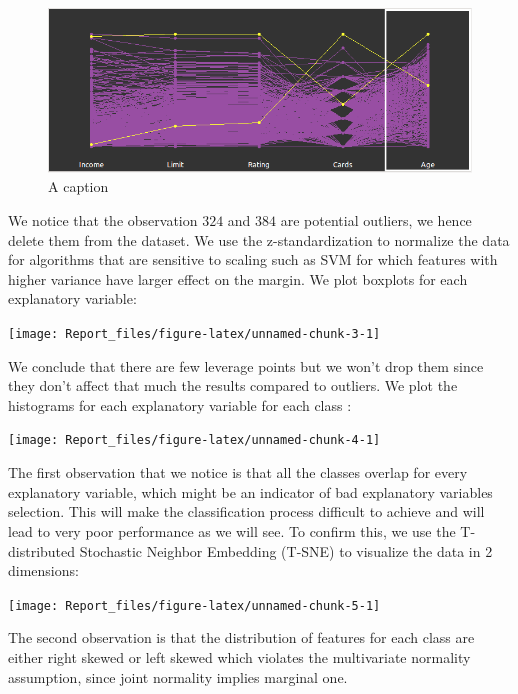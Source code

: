 \documentclass[]{article}
\begin{document}
\begin{figure}
\includegraphics[width=1\linewidth]{plots/potential outliers 384 & 324} \caption{A caption}\label{fig:pressure}
\end{figure}

We notice that the observation \(324\) and \(384\) are potential
outliers, we hence delete them from the dataset. We use the
z-standardization to normalize the data for algorithms that are
sensitive to scaling such as SVM for which features with higher variance
have larger effect on the margin. We plot boxplots for each explanatory
variable:

\begin{center}\texttt{[image: Report\_files/figure-latex/unnamed-chunk-3-1]} \end{center}

We conclude that there are few leverage points but we won't drop them
since they don't affect that much the results compared to outliers. We
plot the histograms for each explanatory variable for each class :

\begin{center}\texttt{[image: Report\_files/figure-latex/unnamed-chunk-4-1]} \end{center}

The first observation that we notice is that all the classes overlap for
every explanatory variable, which might be an indicator of bad
explanatory variables selection. This will make the classification
process difficult to achieve and will lead to very poor performance as
we will see. To confirm this, we use the T-distributed Stochastic
Neighbor Embedding (T-SNE) to visualize the data in 2 dimensions:

\begin{center}\texttt{[image: Report\_files/figure-latex/unnamed-chunk-5-1]} \end{center}

The second observation is that the distribution of features for each
class are either right skewed or left skewed which violates the
multivariate normality assumption, since joint normality implies
marginal one.
\end{document}
